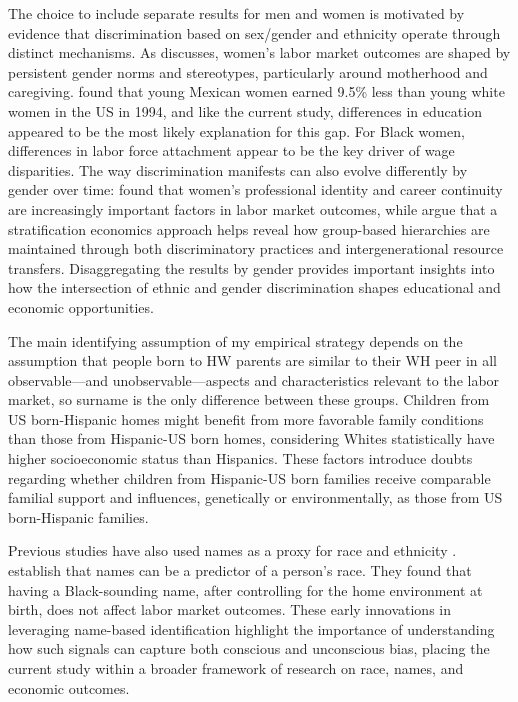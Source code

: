 The choice to include separate results for men and women is motivated by evidence that discrimination based on sex/gender and ethnicity operate through distinct mechanisms. As \textcite{bertrand2020gender} discusses, women's labor market outcomes are shaped by persistent gender norms and stereotypes, particularly around motherhood and caregiving. \textcite{antecol2002relative} found that young Mexican women earned 9.5\% less than young white women in the US in 1994, and like the current study, differences in education appeared to be the most likely explanation for this gap. For Black women, differences in labor force attachment appear to be the key driver of wage disparities. The way discrimination manifests can also evolve differently by gender over time: \textcite{goldin2004making} found that women's professional identity and career continuity are increasingly important factors in labor market outcomes, while \textcite{darity2015tour} argue that a stratification economics approach helps reveal how group-based hierarchies are maintained through both discriminatory practices and intergenerational resource transfers. Disaggregating the results by gender provides important insights into how the intersection of ethnic and gender discrimination shapes educational and economic opportunities.

The main identifying assumption of my empirical strategy depends on the assumption that people born to HW parents are similar to their WH peer in all observable---and unobservable---aspects and characteristics relevant to the labor market, so surname is the only difference between these groups. Children from US born-Hispanic homes might benefit from more favorable family conditions than those from Hispanic-US born homes, considering Whites statistically have higher socioeconomic status than Hispanics.  These factors introduce doubts regarding whether children from Hispanic-US born families receive comparable familial support and influences, genetically or environmentally, as those from US born-Hispanic families.

Previous studies have also used names as a proxy for race and ethnicity \autocite{fryer2004causes, bertrand2004emily}. \textcite{fryer2004causes} establish that names can be a predictor of a person's race. They found that having a Black-sounding name, after controlling for the home environment at birth, does not affect labor market outcomes. These early innovations in leveraging name-based identification highlight the importance of understanding how such signals can capture both conscious and unconscious bias, placing the current study within a broader framework of research on race, names, and economic outcomes. 

